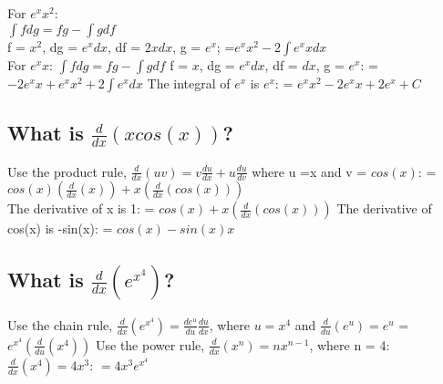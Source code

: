 \documentclass[]{article}
\begin{document}
For \(e^xx^2\):\\
\(\int fdg = fg - \int gdf\)\\
f = \(x^2\), dg = \(e^xdx\), df = \(2xdx\), g = \(e^x\);
=\(e^x x^2 - 2 \int e^x xdx\)\\
For \(e^xx\): \(\int fdg = fg - \int gdf\) f = \(x\), dg = \(e^xdx\), df
= \(dx\), g = \(e^x\): = \(-2e^xx+e^xx^2+2 \int e^x dx\) The integral of
\(e^x\) is \(e^x\): = \(e^xx^2-2e^xx+2e^x + C\)

\subsection{\texorpdfstring{What is
\(\frac{d}{dx}(x cos(x))\)?}{What is \textbackslash{}frac\{d\}\{dx\}(x cos(x))?}}\label{what-is-fracddxx-cosx}

Use the product rule,
\(\frac{d}{dx}(uv) = v\frac{du}{dx} + u\frac{du}{dv}\) where u =x and v
= \(cos(x)\): = \(cos(x)(\frac{d}{dx}(x))+x(\frac{d}{dx}(cos(x)))\)\\
The derivative of x is 1: = \(cos(x)+x(\frac{d}{dx}(cos(x)))\) The
derivative of cos(x) is -sin(x): = \(cos(x) - sin(x)x\)

\subsection{\texorpdfstring{What is
\(\frac{d}{dx}(e^{x^4})\)?}{What is \textbackslash{}frac\{d\}\{dx\}(e\^{}\{x\^{}4\})?}}\label{what-is-fracddxex4}

Use the chain rule,
\(\frac{d}{dx}(e^{x^4})=\frac{de^u}{du} \frac{du}{dx}\), where \(u=x^4\)
and \(\frac{d}{du}(e^u)=e^u\) =\(e^{x^4}(\frac{d}{du}(x^4))\) Use the
power rule, \(\frac{d}{dx}(x^n)=nx^{n-1}\), where n = 4:
\(\frac{d}{dx}(x^4)=4x^3\): \(= 4x^3e^{x^4}\)
\end{document}

